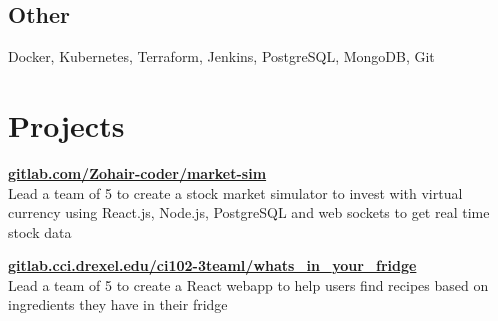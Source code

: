 \documentclass[]{deedy-resume-openfont}
\begin{document}
\begin{minipage}[t]{0.33\textwidth}
    \subsection{Other}
    \vspace{\topsep} %
    Docker, Kubernetes, Terraform,
    Jenkins, PostgreSQL, MongoDB, Git
    
    
    
        
        
        \section {Projects}
        
        \textbf{\href{https://gitlab.com/Zohair-coder/market-sim}{gitlab.com/Zohair-coder/market-sim}} \\
        \vspace{\topsep}
        Lead a team of 5 to create a stock market simulator to invest with virtual currency using React.js, Node.js, PostgreSQL and web sockets to get real time stock data
        
        \vspace{\topsep}
        
        \textbf{\href{https://gitlab.cci.drexel.edu/ci102-3teaml/whats_in_your_fridge}{gitlab.cci.drexel.edu/ci102-3teaml/whats\_in\_your\_fridge}} \\
        \vspace{\topsep}
        Lead a team of 5 to create a React webapp to help users find recipes based on ingredients they have in their fridge
        

\end{minipage}
\end{document}

